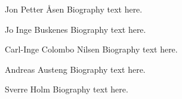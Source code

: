\documentclass[journal]{IEEEtran}
\begin{document}

% 

\newpage

\begin{IEEEbiography}{Jon Petter \AA{}sen}
Biography text here.
\end{IEEEbiography}

\begin{IEEEbiography}{Jo Inge Buskenes}
Biography text here.
\end{IEEEbiography}

\begin{IEEEbiography}{Carl-Inge Colombo Nilsen}
Biography text here.
\end{IEEEbiography}

\newpage

\begin{IEEEbiography}{Andreas Austeng}
Biography text here.
\end{IEEEbiography}

\begin{IEEEbiography}{Sverre Holm}
Biography text here.
\end{IEEEbiography}







\end{document}
